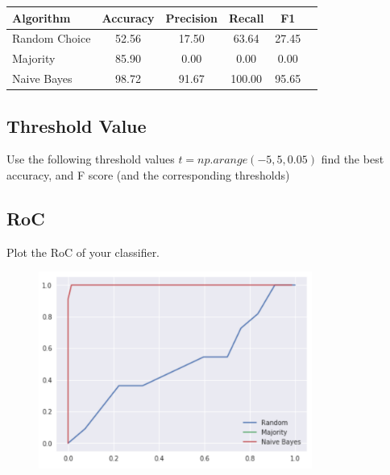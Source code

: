 \documentclass[12pt]{article}
\begin{document}
\begin{tabular}{l*{4}{c}r}
  Algorithm              & Accuracy & Precision & Recall & F1 \\
  \hline
  Random Choice   & 52.56 & 17.50 & 63.64  & 27.45  \\
  Majority        & 85.90 & 0.00  & 0.00   & 0.00  \\
  Naive Bayes     & 98.72 & 91.67 & 100.00 & 95.65  \\
  \end{tabular}

\subsection{Threshold Value}
Use the following threshold values
$t = np.arange(-5,5,0.05)$
find the best accuracy, and F score (and the corresponding thresholds)

\begin{figure}[H]
  \noindent{}
  \end{figure}

\subsection{RoC}
Plot the RoC of your classifier.

\begin{figure}[H]
  \centering
  \includegraphics[width=0.8\textwidth]{roc_less.png}
  \end{figure}
\end{document}
